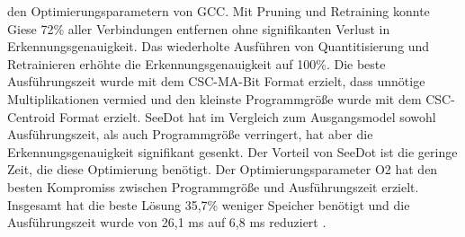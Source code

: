 den Optimierungsparametern von GCC. Mit Pruning und Retraining konnte Giese 72\% aller Verbindungen entfernen ohne signifikanten Verlust in Erkennungsgenauigkeit. Das wiederholte Ausführen von Quantitisierung und
Retrainieren erhöhte die Erkennungsgenauigkeit auf 100\%. Die beste Ausführungszeit wurde mit dem CSC-MA-Bit Format erzielt, dass unnötige Multiplikationen vermied und den kleinste Programmgröße wurde mit dem
CSC-Centroid Format erzielt. SeeDot hat im Vergleich zum Ausgangsmodel sowohl Ausführungszeit, als auch Programmgröße verringert, hat aber die Erkennungsgenauigkeit signifikant gesenkt. Der Vorteil von SeeDot
ist die geringe Zeit, die diese Optimierung benötigt. Der Optimierungsparameter O2 hat den besten Kompromiss zwischen Programmgröße und Ausführungszeit erzielt. Insgesamt hat die beste Lösung 35,7\% weniger Speicher
benötigt und die Ausführungszeit wurde von 26,1 ms auf 6,8 ms reduziert \cite{gieseThesis}.